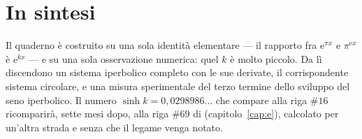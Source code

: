 \section*{In sintesi}

Il quaderno è costruito su una sola identità elementare — il rapporto fra $\mathrm{e}^{\pi x}$ e $\pi^{\mathrm{e}x}$ è $\mathrm{e}^{kx}$ — e su una sola osservazione numerica: quel $k$ è molto piccolo. Da lì discendono un sistema iperbolico completo con le sue derivate, il corrispondente sistema circolare, e una misura sperimentale del terzo termine dello sviluppo del seno iperbolico. Il numero $\sinh k=0{,}0298986\ldots$ che compare alla riga $\#16$ ricomparirà, sette mesi dopo, alla riga $\#69$ di  (capitolo~\ref{cap:e}), calcolato per un'altra strada e senza che il legame venga notato.

